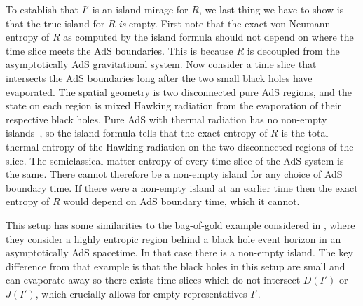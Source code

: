 \documentclass[a4paper,11pt]{article}
\newcommand{\cts}[1]{\ignorespaces}
\begin{document}
\cts{Argument is not rock solid.} To establish that $I'$ is an island mirage for $R$, we last thing we have to show is that the true island for $R$ \textit{is} empty. First note that the exact von Neumann entropy of $R$ as computed by the island formula should not depend on where the time slice meets the AdS boundaries. This is because $R$ is decoupled from the asymptotically AdS gravitational system. 
Now consider a time slice that intersects the AdS boundaries long after the two small black holes have evaporated. The spatial geometry is two disconnected pure AdS regions, and the state on each region is mixed Hawking radiation from the evaporation of their respective black holes. Pure AdS with thermal radiation has no non-empty islands~\cite{}, so the island formula tells that the exact entropy of $R$ is the total thermal entropy of the Hawking radiation on the two disconnected regions of the slice. The semiclassical matter entropy of every time slice of the AdS system is the same. There cannot therefore be a non-empty island for any choice of AdS boundary time. If there were a non-empty island at an earlier time then the exact entropy of $R$ would depend on AdS boundary time, which it cannot.  

This setup has some similarities to the bag-of-gold example considered in \cite{Bousso2021}, where they consider a highly entropic region behind a black hole event horizon in an asymptotically AdS spacetime. In that case there is a non-empty island. The key difference from that example is that the black holes in this setup are small and can evaporate away so there exists time slices which do not intersect $D(I')$ or $J(I')$, which crucially allows for empty representatives $\tilde{I}'$. 
\fi



\end{document}
